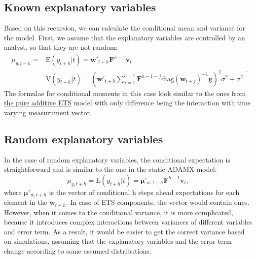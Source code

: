 \documentclass[
]{book}
\theoremstyle{definition}
\theoremstyle{definition}
\theoremstyle{definition}
\theoremstyle{definition}
\theoremstyle{remark}
\begin{document}
\hypertarget{known-explanatory-variables}{%
\subsection{Known explanatory variables}\label{known-explanatory-variables}}

Based on this recursion, we can calculate the conditional mean and variance for the model. First, we assume that the explanatory variables are controlled by an analyst, so that they are not random:
\begin{equation}
  \begin{aligned}
    \mu_{y,t+h} = & \text{E}(y_{t+h}|t) = \mathbf{w}'_{t+h} \mathbf{F}^{h-1} \mathbf{v}_{t} \\
    & \text{V}(y_{t+h}|t) = \left(\mathbf{w}'_{t+h} \sum_{j=1}^{h-1} \mathbf{F}^{h-1-j} \mathrm{diag}\left(\mathbf{w}_{t+j}\right)^{-1} \mathbf{g} \right)^2 \sigma^2 + \sigma^2
  \end{aligned} .
  \label{eq:ADAMETSXPureAdditiveDynamicNonSeasonalMomentsNonRandom}
\end{equation}
The formulae for conditional moments in this case look similar to the ones from \protect\hyperlink{pureAdditiveExpectationAndVariance}{the pure additive ETS} model with only difference being the interaction with time varying measurument vector.

\hypertarget{random-explanatory-variables}{%
\subsection{Random explanatory variables}\label{random-explanatory-variables}}

In the case of random explanatory variables, the conditional expectation is straightforward and is similar to the one in the static ADAMX model:
\begin{equation}
    \mu_{y,t+h} = \text{E}(y_{t+h}|t) = \boldsymbol{\mu}'_{w,t+h} \mathbf{F}^{h-1} \mathbf{v}_{t} ,
  \label{eq:ADAMETSXPureAdditiveDynamicNonSeasonalMomentsRandom}
\end{equation}
where \(\boldsymbol{\mu}'_{w,t+h}\) is the vector of conditional h steps ahead expectations for each element in the \(\mathbf{w}_{t+h}\). In case of ETS components, the vector would contain ones. However, when it comes to the conditional variance, it is more complicated, because it introduces complex interactions between variances of different variables and error term. As a result, it would be easier to get the correct variance based on simulations, assuming that the explanatory variables and the error term change according to some assumed distributions.
\end{document}
